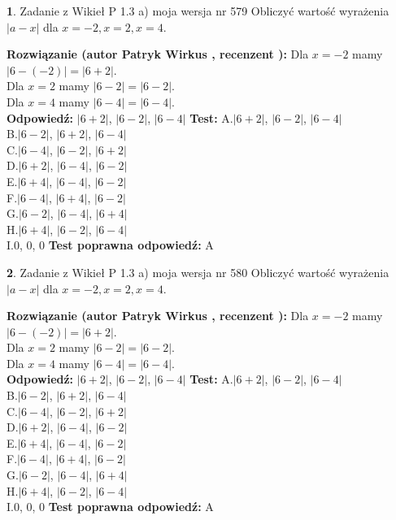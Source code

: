 \documentclass[12pt, a4paper]{article}
\theoremstyle{definition} %
\newtheorem{zad}{}
\newcommand{\zadStart}[1]{\begin{zad}#1\newline}
\newcommand{\zadStop}{\end{zad}}
\newcommand{\rozwStart}[2]{\noindent \textbf{Rozwiązanie (autor #1 , recenzent #2): }\newline}
\newcommand{\rozwStop}{\newline}
\newcommand{\odpStart}{\noindent \textbf{Odpowiedź:}\newline}
\newcommand{\odpStop}{\newline}
\newcommand{\testStart}{\noindent \textbf{Test:}\newline}
\newcommand{\testStop}{\newline}
\newcommand{\kluczStart}{\noindent \textbf{Test poprawna odpowiedź:}\newline}
\newcommand{\kluczStop}{\newline}
\begin{document}
\zadStart{Zadanie z Wikieł P 1.3 a) moja wersja nr 579}
Obliczyć wartość wyrażenia $|a - x|$ dla $x=-2,x=2,x=4$.
\zadStop
\rozwStart{Patryk Wirkus}{}
Dla $x = -2$ mamy $|6 - (-2)| = |6 + 2|$.\\
Dla $x = 2$ mamy $|6 - 2| = |6 - 2|$.\\
Dla $x = 4$ mamy $|6 - 4| = |6 - 4|$.\\
\rozwStop
\odpStart
$|6 + 2|$, $|6 - 2|$, $|6 - 4|$
\odpStop
\testStart
A.$|6 + 2|$, $|6 - 2|$, $|6 - 4|$\\
B.$|6 - 2|$, $|6 + 2|$, $|6 - 4|$\\
C.$|6 - 4|$, $|6 - 2|$, $|6 + 2|$\\
D.$|6 + 2|$, $|6 - 4|$, $|6 - 2|$\\
E.$|6 + 4|$, $|6 - 4|$, $|6 - 2|$\\
F.$|6 - 4|$, $|6 + 4|$, $|6 - 2|$\\
G.$|6 - 2|$, $|6 - 4|$, $|6 + 4|$\\
H.$|6 + 4|$, $|6 - 2|$, $|6 - 4|$\\
I.$0$, $0$, $0$
\testStop
\kluczStart
A
\kluczStop



\zadStart{Zadanie z Wikieł P 1.3 a) moja wersja nr 580}
Obliczyć wartość wyrażenia $|a - x|$ dla $x=-2,x=2,x=4$.
\zadStop
\rozwStart{Patryk Wirkus}{}
Dla $x = -2$ mamy $|6 - (-2)| = |6 + 2|$.\\
Dla $x = 2$ mamy $|6 - 2| = |6 - 2|$.\\
Dla $x = 4$ mamy $|6 - 4| = |6 - 4|$.\\
\rozwStop
\odpStart
$|6 + 2|$, $|6 - 2|$, $|6 - 4|$
\odpStop
\testStart
A.$|6 + 2|$, $|6 - 2|$, $|6 - 4|$\\
B.$|6 - 2|$, $|6 + 2|$, $|6 - 4|$\\
C.$|6 - 4|$, $|6 - 2|$, $|6 + 2|$\\
D.$|6 + 2|$, $|6 - 4|$, $|6 - 2|$\\
E.$|6 + 4|$, $|6 - 4|$, $|6 - 2|$\\
F.$|6 - 4|$, $|6 + 4|$, $|6 - 2|$\\
G.$|6 - 2|$, $|6 - 4|$, $|6 + 4|$\\
H.$|6 + 4|$, $|6 - 2|$, $|6 - 4|$\\
I.$0$, $0$, $0$
\testStop
\kluczStart
A
\kluczStop
\end{document}
